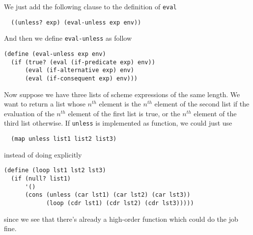 \documentclass[a4paper,12pt]{article}
\begin{document}
We just add the following clause to the definition of \lstinline!eval!

\begin{lstlisting}
  ((unless? exp) (eval-unless exp env))
\end{lstlisting}

And then we define \lstinline!eval-unless! as follow

\begin{lstlisting}
(define (eval-unless exp env)
  (if (true? (eval (if-predicate exp) env))
      (eval (if-alternative exp) env)
      (eval (if-consequent exp) env)))
\end{lstlisting}

Now suppose we have three lists of scheme expressions of the same
length.  We want to return a list whose $n^{th}$ element is the
$n^{th}$ element of the second list if the evaluation of the $n^{th}$
element of the first list is true, or the $n^{th}$ element of the
third list otherwise.  If \lstinline!unless! is implemented as
function, we could just use

\begin{lstlisting}
  (map unless list1 list2 list3)
\end{lstlisting}

instead of doing explicitly

\begin{lstlisting}
(define (loop lst1 lst2 lst3)
  (if (null? list1)
      '()
      (cons (unless (car lst1) (car lst2) (car lst3))
            (loop (cdr lst1) (cdr lst2) (cdr lst3)))))
\end{lstlisting}

since we see that there's already a high-order function which could do
the job fine.
\end{document}
